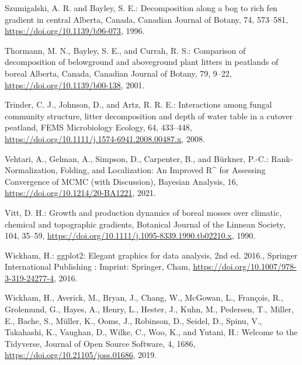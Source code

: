 \documentclass[
  12pt,
]{article}
\newlength{\cslhangindent}
\newlength{\cslentryspacingunit} %
\newenvironment{CSLReferences}[2] %
 {%
  \setlength{\parindent}{0pt}
  \ifodd #1
  \let\oldpar\par
  \def\par{\hangindent=\cslhangindent\oldpar}
  \fi
  \setlength{\parskip}{#2\cslentryspacingunit}
 }%
 {}
\begin{document}
\begin{CSLReferences}{0}{0}
\leavevmode{}%
Szumigalski, A. R. and Bayley, S. E.: Decomposition along a bog to rich fen gradient in central {Alberta}, {Canada}, Canadian Journal of Botany, 74, 573--581, \url{https://doi.org/10.1139/b96-073}, 1996.

\leavevmode{}%
Thormann, M. N., Bayley, S. E., and Currah, R. S.: Comparison of decomposition of belowground and aboveground plant litters in peatlands of boreal {Alberta}, {Canada}, Canadian Journal of Botany, 79, 9--22, \url{https://doi.org/10.1139/b00-138}, 2001.

\leavevmode{}%
Trinder, C. J., Johnson, D., and Artz, R. R. E.: Interactions among fungal community structure, litter decomposition and depth of water table in a cutover peatland, FEMS Microbiology Ecology, 64, 433--448, \url{https://doi.org/10.1111/j.1574-6941.2008.00487.x}, 2008.

\leavevmode{}%
Vehtari, A., Gelman, A., Simpson, D., Carpenter, B., and Bürkner, P.-C.: Rank-{Normalization}, {Folding}, and {Localization}: {An Improved R{\^{}}} for {Assessing Convergence} of {MCMC} (with {Discussion}), Bayesian Analysis, 16, \url{https://doi.org/10.1214/20-BA1221}, 2021.

\leavevmode{}%
Vitt, D. H.: Growth and production dynamics of boreal mosses over climatic, chemical and topographic gradients, Botanical Journal of the Linnean Society, 104, 35--59, \url{https://doi.org/10.1111/j.1095-8339.1990.tb02210.x}, 1990.

\leavevmode{}%
Wickham, H.: {ggplot2}: {Elegant} graphics for data analysis, 2nd ed. 2016., Springer International Publishing : Imprint: Springer, Cham, \url{https://doi.org/10.1007/978-3-319-24277-4}, 2016.

\leavevmode{}%
Wickham, H., Averick, M., Bryan, J., Chang, W., McGowan, L., François, R., Grolemund, G., Hayes, A., Henry, L., Hester, J., Kuhn, M., Pedersen, T., Miller, E., Bache, S., Müller, K., Ooms, J., Robinson, D., Seidel, D., Spinu, V., Takahashi, K., Vaughan, D., Wilke, C., Woo, K., and Yutani, H.: Welcome to the {Tidyverse}, Journal of Open Source Software, 4, 1686, \url{https://doi.org/10.21105/joss.01686}, 2019.

\end{CSLReferences}
\end{document}
